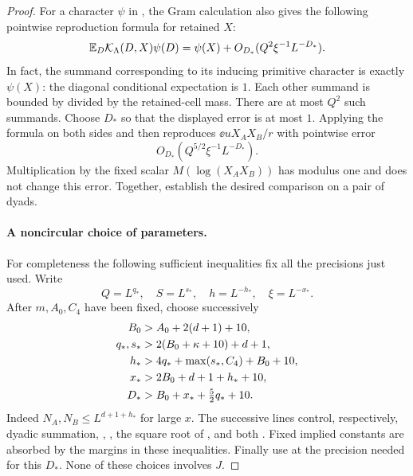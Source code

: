 \begin{proof}
For a character $\psi$ in ,
the Gram calculation also gives the following pointwise
reproduction formula for retained $X$:
\begin{equation}\label{eq:ideal-character-reproduction}
 \mathbb E_D\mathcal K_\Lambda(D,X)\psi(D)
 =\psi(X)+O_{D_*}(Q^2\xi^{-1}L^{-D_*}).
\end{equation}
In fact, the summand corresponding to its inducing primitive
character is exactly $\psi(X)$: the diagonal conditional
expectation is $1$.  Each other summand is bounded by
 divided by the retained-cell
mass.  There are at most $Q^2$ such summands.  Choose $D_*$ so
that the displayed error is at most $1$.  Applying the formula
on both sides and then 
reproduces $\ee{uX_AX_B/r}$ with pointwise error
\begin{equation}\label{eq:ideal-major-character-error}
 O_{D_*}(Q^{5/2}\xi^{-1}L^{-D_*}).
\end{equation}
Multiplication by the fixed scalar $M(\log(X_AX_B))$ has
modulus one and does not change this error.  Together,
establish the desired comparison on a pair of dyads.

\paragraph{A noncircular choice of parameters.}
For completeness the following sufficient inequalities fix all
the precisions just used.  Write
\[
 Q=L^{q_*},\quad S=L^{s_*},\quad
 h=L^{-h_*},\quad \xi=L^{-x_*}.
\]
After $m,A_0,C_4$ have been fixed, choose successively
\begin{align}
 B_0&>A_0+2(d+1)+10,\notag\\
 q_*,s_*&>2(B_0+\kappa+10)+d+1,\notag\\
 h_*&>4q_*+\max(s_*,C_4)+B_0+10,\label{eq:ideal-parameter-order}\\
 x_*&>2B_0+d+1+h_*+10,\notag\\
 D_*&>B_0+x_*+\tfrac52q_*+10.\notag
\end{align}
Indeed $N_A,N_B\leq L^{d+1+h_*}$ for large $x$.
The successive lines control, respectively, dyadic summation,
, , the
square root of , and both
.
Fixed implied constants are absorbed by the margins in these
inequalities.  Finally use  at the precision needed
for this $D_*$.  None of these choices involves $J$.
\end{proof}

